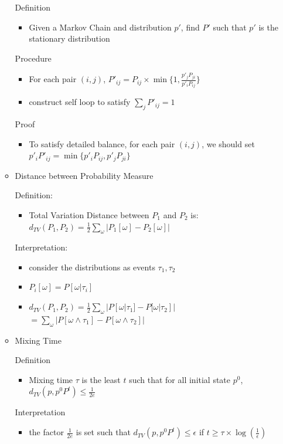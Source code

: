 \documentclass[a4paper]{article}
\begin{document}
\begin{itemize}
\begin{itemize}
                Definition
                \begin{itemize}
                    \item Given a Markov Chain and distribution $p'$, find $P'$ such that $p'$ is the stationary distribution
                \end{itemize}
                Procedure
                \begin{itemize}
                    \item For each pair $(i,j)$, $P'_{ij} = P_{ij} \times \min\{1, \frac{p'_j P_{ji}}{p'_i P_{ij}} \}$
                    \item construct self loop to satisfy $\sum_j P'_{ij} = 1$
                \end{itemize}
                Proof
                \begin{itemize}
                    \item To satisfy detailed balance, for each pair $(i, j)$, we should set $p'_i P'_{ij} = \min\{p'_i P_{ij}, p'_j P_{ji}\}$ 
                \end{itemize}
            \item Distance between Probability Measure
                
                Definition:
                \begin{itemize}
                    \item Total Variation Distance between $P_1$ and $P_2$ is: $d_{\mathit{TV}}(P_1, P_2) = \frac{1}{2} \sum_{\omega} |P_1[\omega] - P_2[\omega]|$
                \end{itemize}
                Interpretation:
                \begin{itemize}
                    \item consider the distributions as events $\tau_1, \tau_2$
                    \item $P_i[\omega] = P[\omega|\tau_i]$
                    \item $d_{\mathit{TV}}(P_1, P_2) = \frac{1}{2} \sum_{\omega} |P[\omega | \tau_1] - P[\omega | \tau_2]|$
                        $= \sum_{\omega} |P[\omega \wedge \tau_1] - P[\omega \wedge \tau_2]|$
                \end{itemize}
            \item Mixing Time

                Definition
                \begin{itemize}
                    \item Mixing time $\tau$ is the least $t$ such that for all initial state $p^0$, $d_\mathit{TV}(p, p^0P^t) \leq \frac{1}{2e}$
                \end{itemize}
                Interpretation
                \begin{itemize}
                    \item the factor $\frac{1}{2e}$ is set such that $d_\mathit{TV}(p, p^0P^t) \leq \epsilon$ if $t \geq \tau \times \log(\frac{1}{\epsilon})$


\end{itemize}
\end{itemize}
\end{itemize}
\end{document}
